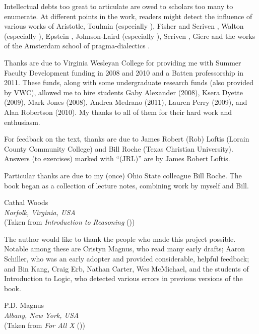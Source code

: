 \begin{fullwidth}

Intellectual debts too great to articulate are owed to scholars too many to enumerate. At different points in the work, readers might detect the influence of various works of Aristotle, Toulmin (especially \cite{Toulmin1958}), Fisher and Scriven \citep{Fisher1997}, Walton (especially \cite{Walton1996}), Epstein \citep{Epstein2002}, Johnson-Laird (especially \citep{johnson2006we}), Scriven \citep{Scriven1962}, Giere \citep{giere1997understanding} and the works of the Amsterdam school of pragma-dialectics \citep{van2002argumentation}.

Thanks are due to Virginia Wesleyan College for providing me with Summer Faculty Development funding in 2008 and 2010 and a Batten professorship in 2011. These funds, along with some undergraduate research funds (also provided by VWC), allowed me to hire students Gaby Alexander (2008), Ksera Dyette (2009), Mark Jones (2008), Andrea Medrano (2011), Lauren Perry (2009), and Alan Robertson (2010). My thanks to all of them for their hard work and enthusiasm.

For feedback on the text, thanks are due to James Robert (Rob) Loftis (Lorain County Community College) and Bill Roche (Texas Christian University). Answers (to exercises) marked with “(JRL)” are by James Robert Loftis.

Particular thanks are due to my (once) Ohio State colleague Bill Roche. The book began as a collection of lecture notes, combining work by myself and Bill.

\begin{adjustwidth}{2em}{0em}
Cathal Woods\\
\noindent\emph{Norfolk, Virginia, USA}\\
\noindent(Taken from \emph{Introduction to Reasoning} (\citeyear{Woods2014}))
\end{adjustwidth}

\end{fullwidth}

\vspace{3cm}
\begin{fullwidth}

\noindent The author would like to thank the people who made this project possible. Notable among these are Cristyn Magnus, who read many early drafts; Aaron Schiller, who was an early adopter and provided considerable, helpful feedback; {and} Bin Kang, Craig Erb, Nathan Carter, Wes McMichael, and the students of Introduction to Logic, who detected various errors in previous versions of the book.


\begin{adjustwidth}{2em}{0em}
P.D. Magnus \\
\noindent\emph{Albany, New York, USA}\\
\noindent(Taken from \emph{For All X} (\citeyear{Magnus2008}))
\end{adjustwidth}
\end{fullwidth}
